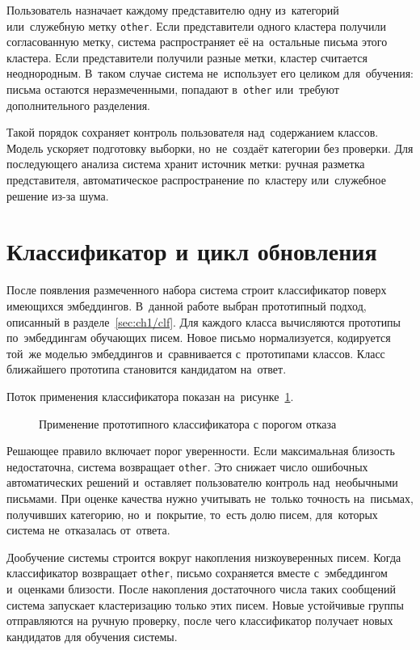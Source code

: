Пользователь назначает каждому представителю одну из~категорий или~служебную
метку \texttt{other}. Если представители одного кластера получили согласованную
метку, система распространяет её на~остальные письма этого кластера. Если
представители получили разные метки, кластер считается неоднородным. В~таком
случае система не~использует его целиком для~обучения: письма остаются
неразмеченными, попадают в~\texttt{other} или~требуют дополнительного
разделения.

Такой порядок сохраняет контроль пользователя над~содержанием классов. Модель
ускоряет подготовку выборки, но~не~создаёт категории без проверки. Для
последующего анализа система хранит источник метки: ручная разметка
представителя, автоматическое распространение по~кластеру или~служебное
решение из-за шума.

\section{Классификатор и цикл обновления}\label{sec:ch2/classifier}

После появления размеченного набора система строит классификатор поверх имеющихся
эмбеддингов. В~данной работе выбран прототипный подход, описанный в
разделе~\ref{sec:ch1/clf}. Для каждого класса вычисляются
прототипы по~эмбеддингам обучающих писем. Новое письмо нормализуется,
кодируется той~же моделью эмбеддингов и~сравнивается с~прототипами классов.
Класс ближайшего прототипа становится кандидатом на~ответ.

Поток применения классификатора показан на~рисунке~\ref{fig:ch2/classifier}.

\begin{figure}[htbp]
    \centering
    \resizebox{\textwidth}{!}{%
    }
    \caption{Применение прототипного классификатора с порогом отказа}\label{fig:ch2/classifier}
\end{figure}
\FloatBarrier

Решающее правило включает порог уверенности. Если максимальная близость
недостаточна, система возвращает \texttt{other}. Это снижает число ошибочных
автоматических решений и~оставляет пользователю контроль над~необычными
письмами. При оценке качества нужно учитывать не~только точность на~письмах,
получивших категорию, но~и~покрытие, то~есть долю писем, для~которых система
не~отказалась от~ответа.

Дообучение системы строится вокруг накопления низкоуверенных писем.
Когда классификатор возвращает \texttt{other}, письмо сохраняется
вместе с~эмбеддингом и~оценками близости. После накопления достаточного числа
таких сообщений система запускает кластеризацию только этих писем.
Новые устойчивые группы отправляются на ручную проверку, после
чего классификатор получает новых кандидатов для обучения системы.


